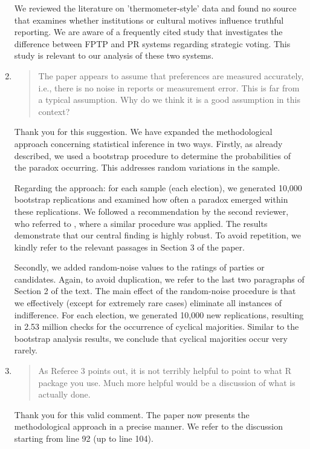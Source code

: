 \documentclass[a4paper, 12pt]{scrartcl}
\begin{document}
\begin{enumerate}[label=(\alph*)]
We reviewed the literature on 'thermometer-style' data and found no source that examines whether institutions or cultural motives influence truthful reporting. We are aware of a frequently cited study that investigates the difference between FPTP and PR systems regarding strategic voting. This study is relevant to our analysis of these two systems.

\item \begin{quote}
	The paper appears to assume that preferences are measured accurately, i.e., there is no noise in reports or measurement 	error. This is far from a typical assumption. Why do we think it is a good assumption in this context?
\end{quote}
Thank you for this suggestion. We have expanded the methodological approach concerning statistical inference in two ways. Firstly, as already described, we used a bootstrap procedure to determine the probabilities of the paradox occurring. This addresses random variations in the sample.

Regarding the approach: for each sample (each election), we generated 10,000 bootstrap replications and examined how often a paradox emerged within these replications. We followed a recommendation by the second reviewer, who referred to \cite{Darmann2019}, where a similar procedure was applied. The results demonstrate that our central finding is highly robust. To avoid repetition, we kindly refer to the relevant passages in Section 3 of the paper.

Secondly, we added random-noise values to the ratings of parties or candidates. Again, to avoid duplication, we refer to the last two paragraphs of Section 2 of the text. The main effect of the random-noise procedure is that we effectively (except for extremely rare cases) eliminate all instances of indifference. For each election, we generated 10,000 new replications, resulting in 2.53 million checks for the occurrence of cyclical majorities. Similar to the bootstrap analysis results, we conclude that cyclical majorities occur very rarely.

\item \begin{quote}
	As Referee 3 points out, it is not terribly helpful to point to what R package you use. Much more helpful would be a discussion of what is actually done.
\end{quote}
Thank you for this valid comment. The paper now presents the methodological approach in a precise manner. We refer to the discussion starting from line 92 (up to line 104).
\end{enumerate}
\end{document}
